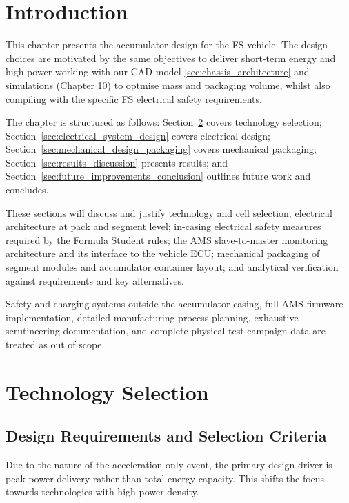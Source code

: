 \documentclass[11pt, a4paper]{report}
\numberwithin{equation}{section}
\begin{document}
\begin{refsection}
\graphicspath{{../PaulVogelberg/Engineering/}}

\section{Introduction}
This chapter presents the accumulator design for the FS vehicle. The design choices are motivated by the same objectives to deliver short-term energy and high power working with our CAD model \ref{sec:chassis_architecture} and simulations (Chapter 10) to optmise mass and packaging volume, whilst also compiling with the specific FS electrical safety requirements.

The chapter is structured as follows: Section~\ref{sec:technology_selection} covers technology selection; Section~\ref{sec:electrical_system_design} covers electrical design; Section~\ref{sec:mechanical_design_packaging} covers mechanical packaging; Section~\ref{sec:results_discussion} presents results; and Section~\ref{sec:future_improvements_conclusion} outlines future work and concludes.

These sections will discuss and justify technology and cell selection; electrical architecture at pack and segment level; in-casing electrical safety measures required by the Formula Student rules; the AMS slave-to-master monitoring architecture and its interface to the vehicle ECU; mechanical packaging of segment modules and accumulator container layout; and analytical verification against requirements and key alternatives.

Safety and charging systems outside the accumulator casing, full AMS firmware implementation, detailed manufacturing process planning, exhaustive scrutineering documentation, and complete physical test campaign data are treated as out of scope.

\section{Technology Selection}
\label{sec:technology_selection}

\subsection{Design Requirements and Selection Criteria}
Due to the nature of the acceleration-only event, the primary design driver is peak power delivery rather than total energy capacity. This shifts the focus towards technologies with high power density.


\end{refsection}
\end{document}
